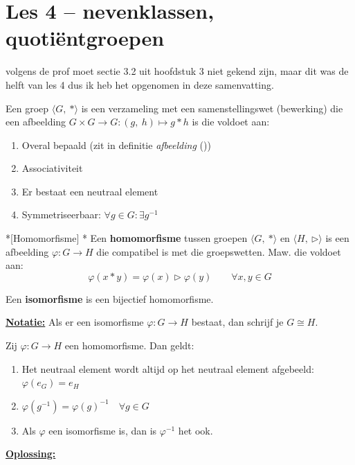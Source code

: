 \section{Les 4 -- nevenklassen, quotiëntgroepen}

\begin{barbox}[red][red!10]
     volgens de prof moet sectie 3.2 uit hoofdstuk 3 niet gekend zijn, maar dit was de helft van les 4 dus ik heb het opgenomen in deze samenvatting.
\end{barbox}

\textbf{} Een groep $\langle G,\ * \rangle$ is een verzameling met een samenstellingswet (bewerking) die een afbeelding $G \times G \to G: (g,\ h) \mapsto g*h$ is die voldoet aan:
\begin{enumerate}
    \item Overal bepaald (zit in definitie \emph{afbeelding} ())
    \item Associativiteit
    \item Er bestaat een neutraal element
    \item Symmetriseerbaar: $\forall g \in G : \exists g^{-1}$
\end{enumerate}

\begin{nicedefinition}*[Homomorfisme]
    \nextpart[]*
    Een \textcolor{PineGreen!75!black}{\textbf{homomorfisme}} tussen groepen $\langle G,\ * \rangle$ en $\langle H,\ \triangleright \rangle$ is een afbeelding $\varphi : G \to H$ die compatibel is met die groepswetten. Maw. die voldoet aan:
    \begin{equation*}
        \varphi(x * y) = \varphi(x) \triangleright \varphi(y) \qquad \forall x,y \in G
    \end{equation*} 

    \vspace{0.25cm}

    Een \textcolor{PineGreen!75!black}{\textbf{isomorfisme}} is een bijectief homomorfisme.
\end{nicedefinition}

\textbf{\underline{Notatie:}} Als er een isomorfisme $\varphi : G \to H$ bestaat, dan schrijf je $G \cong H$.

\begin{niceexercise}
    Zij $\varphi : G \to H$ een homomorfisme. Dan geldt:
    \begin{enumerate}
        \item Het neutraal element wordt altijd op het neutraal element afgebeeld: $\varphi(e_G) = e_H$
        \item $\varphi(g^{-1}) = \varphi(g)^{-1} \quad \forall g \in G$
        \item Als $\varphi$ een isomorfisme is, dan is $\varphi^{-1}$ het ook.
    \end{enumerate}
\end{niceexercise}
\textbf{\underline{Oplossing:}}


